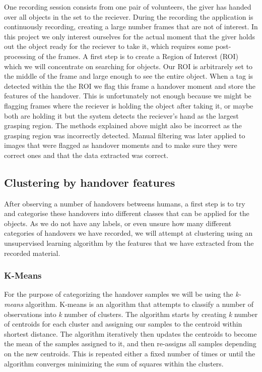 One recording session consists from one pair of volunteers, the giver has handed over all objects in the set to the reciever. During the recording the application is continuously recording, creating a large number frames that are not of interest. In this project we only interest ourselves for the actual moment that the giver holds out the object ready for the reciever to take it, which requires some post-processing of the frames. A first step is to create a Region of Interest (ROI) which we will concentrate on searching for objects. Our ROI is arbitrarely set to the middle of the frame and large enough to see the entire object. When a tag is detected within the the ROI we flag this frame a handover moment and store the features of the handover. This is unfortunately not enough because we might be flagging frames where the reciever is holding the object after taking it, or maybe both are holding it but the system detects the reciever's hand as the largest grasping region. The methods explained above might also be incorrect as the grasping region was incorrectly detected. Manual filtering was later applied to images that were flagged as handover moments and to make sure they were correct ones and that the data extracted was correct.

\subsection{Clustering by handover features}

After observing a number of handovers betweens humans, a first step is to try and categorise these handovers into different classes that can be applied for the objects. As we do not have any labels, or even unsure how many different categories of handovers we have recorded, we will attempt at clustering using an unsupervised learning algorithm by the features that we have extracted from the recorded material.

\subsubsection{K-Means}

For the purpose of categorizing the handover samples we will be using the \emph{k-means} algorithm. K-means is an algorithm that attempts to classify a number of observations into \emph{k} number of clusters. The algorithm starts by creating \emph{k} number of centroids for each cluster and assigning our samples to the centroid within shortest distance. The algorithm iteratively then updates the centroids to become the mean of the samples assigned to it, and then re-assigns all samples depending on the new centroids. This is repeated either a fixed number of times or until the algorithm converges minimizing the sum of squares within the clusters.

